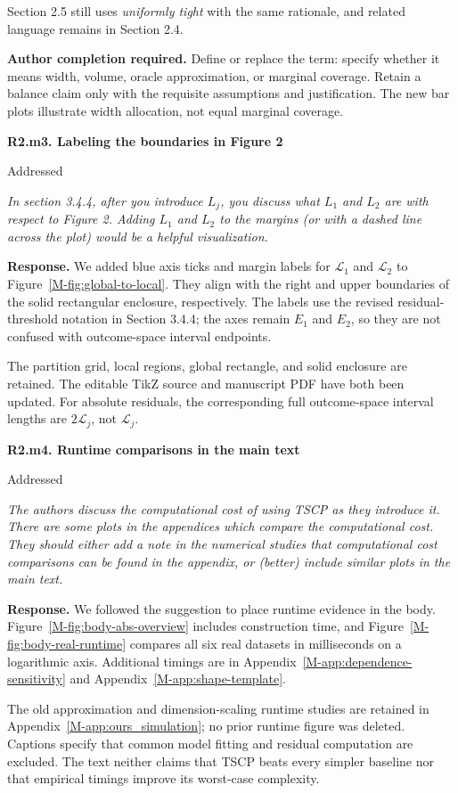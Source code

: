 \documentclass[11pt]{article}
\newcommand{\msapp}[1]{Appendix~\ref*{M-#1}}
\newcommand{\msfig}[1]{Figure~\ref*{M-#1}}
\newcommand{\action}[1]{\par{\small\color{ActionRed}\textbf{Author completion required.} #1\par}}
\newcommand{\point}[3]{\par\Needspace{7\baselineskip}\medskip
\noindent\parbox[t]{0.77\linewidth}{\textbf{#1}}\hfill
\parbox[t]{0.21\linewidth}{\raggedleft\small\sffamily #2}\par\nopagebreak
{\color{ReviewerBlue}\small\itshape #3\par}\textbf{Response.} }
\begin{document}
Section 2.5 still uses \emph{uniformly tight} with the same rationale, and related language remains in Section 2.4.

\action{Define or replace the term: specify whether it means width, volume, oracle approximation, or marginal coverage. Retain a balance claim only with the requisite assumptions and justification. The new bar plots illustrate width allocation, not equal marginal coverage.}

\point{R2.m3. Labeling the boundaries in Figure 2}{Addressed}{In section 3.4.4, after you introduce $L_j$, you discuss what
$L_1$ and $L_2$ are with respect to Figure 2. Adding $L_1$ and
$L_2$ to the margins (or with a dashed line across the plot)
would be a helpful visualization.}
\label{response:R2.m3}
We added blue axis ticks and margin labels for $\mathcal L_1$ and $\mathcal L_2$ to \msfig{fig:global-to-local}. They align with the right and upper boundaries of the solid rectangular enclosure, respectively. The labels use the revised residual-threshold notation in Section 3.4.4; the axes remain $E_1$ and $E_2$, so they are not confused with outcome-space interval endpoints.

The partition grid, local regions, global rectangle, and solid enclosure are retained. The editable TikZ source and manuscript PDF have both been updated. For absolute residuals, the corresponding full outcome-space interval lengths are $2\mathcal L_j$, not $\mathcal L_j$.

\point{R2.m4. Runtime comparisons in the main text}{Addressed}{The authors discuss the computational cost of using TSCP as they
introduce it. There are some plots in the appendices which compare
the computational cost. They should either add a note in the
numerical studies that computational cost comparisons can be
found in the appendix, or (better) include similar plots in the
main text.}
\label{response:R2.m4}
We followed the suggestion to place runtime evidence in the body. \msfig{fig:body-abs-overview} includes construction time, and \msfig{fig:body-real-runtime} compares all six real datasets in milliseconds on a logarithmic axis. Additional timings are in \msapp{app:dependence-sensitivity} and \msapp{app:shape-template}.

The old approximation and dimension-scaling runtime studies are retained in \msapp{app:ours_simulation}; no prior runtime figure was deleted. Captions specify that common model fitting and residual computation are excluded. The text neither claims that TSCP beats every simpler baseline nor that empirical timings improve its worst-case complexity.
\end{document}
